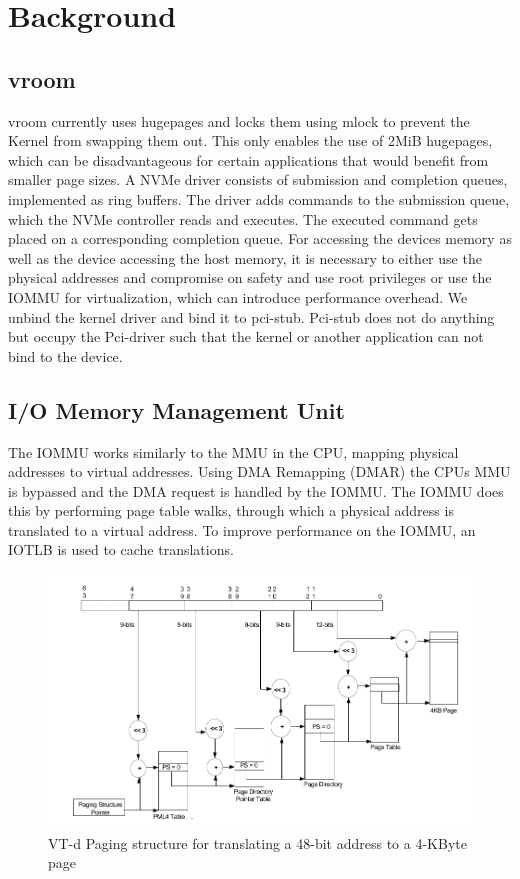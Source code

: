\chapter{Background}

\section{vroom}
vroom currently uses hugepages and locks them using mlock to prevent the Kernel from swapping them out.
This only enables the use of 2MiB hugepages, which can be disadvantageous for certain applications that would benefit from smaller page sizes.
A NVMe driver consists of submission and completion queues, implemented as ring buffers.
The driver adds commands to the submission queue, which the NVMe controller reads and executes.
The executed command gets placed on a corresponding completion queue.
For accessing the devices memory as well as the device accessing the host memory, it is necessary to either use the physical addresses and compromise on safety and use root privileges or use the IOMMU for virtualization, which can introduce performance overhead.
We unbind the kernel driver and bind it to pci-stub. Pci-stub does not do anything but occupy the Pci-driver such that the kernel or another application can not bind to the device.

\section{I/O Memory Management Unit}
The IOMMU works similarly to the MMU in the CPU, mapping physical addresses to virtual addresses.
Using DMA Remapping (DMAR) the CPUs MMU is bypassed and the DMA request is handled by the IOMMU.
The IOMMU does this by performing page table walks, through which a physical address is translated to a virtual address.
To improve performance on the IOMMU, an IOTLB is used to cache translations.

\begin{figure}
    \centering
    \includegraphics[width=\textwidth]{figures/4kibtranslation.pdf}
    \caption{VT-d Paging structure for translating a 48-bit address to a 4-KByte page}
    \label{fig:pagewalk4kib}
\end{figure}

